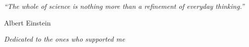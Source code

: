 \documentclass[a4paper, 11pt, twoside]{book}  %
\numberwithin{equation}{section}
\begin{document}
\dominitoc
\frontmatter      %
\pagestyle{empty}  %
%

\cleardoublepage
\null\vfill
\begin{minipage}{5in}
  \textit{``The whole of science is nothing more than a refinement of everyday thinking.''}
\end{minipage}
\begin{flushright}
Albert Einstein
\end{flushright}
\vfill\vfill\null
\cleardoublepage  %

\cleardoublepage

\pagestyle{fancy}
\fancyhead{}  %
\fancyhead[RE, LO]{\thepage}
\fancyhead[RO]{\rightmark}
\fancyhead[LE]{\leftmark}
\cfoot{}

\adjustmtc
\setcounter{tocdepth}{1}
\tableofcontents  %
\listoffigures  {} \mtcaddchapter%
\listoftables  {}  \mtcaddchapter   %

\cleardoublepage
\pagestyle{empty}
\null\vfil
\begin{center}{\Large \sl Dedicated to the ones who supported me}\end{center}
\vfil\null
\cleardoublepage
{}  %

\mainmatter	  %
\pagestyle{fancy}
\adjustmtc




\backmatter
\label{Bibliography}
\renewcommand\bibname{References}

\end{document}
